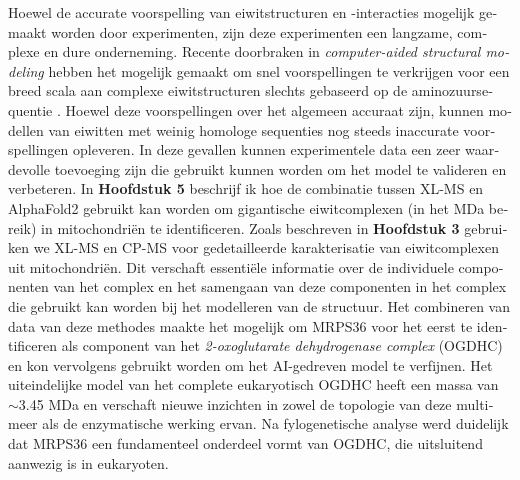 \begin{otherlanguage}{dutch}
    Hoewel de accurate voorspelling van eiwitstructuren en -interacties mogelijk gemaakt worden door experimenten, zijn deze experimenten een langzame, complexe en dure onderneming. Recente doorbraken in \emph{computer-aided structural modeling} hebben het mogelijk gemaakt om snel voorspellingen te verkrijgen voor een breed scala aan complexe eiwitstructuren slechts gebaseerd op de aminozuursequentie \cite{RN5, RN4}. Hoewel deze voorspellingen over het algemeen accuraat zijn, kunnen modellen van eiwitten met weinig homologe sequenties nog steeds inaccurate voorspellingen opleveren. In deze gevallen kunnen experimentele data een zeer waardevolle toevoeging zijn die gebruikt kunnen worden om het model te valideren en verbeteren. In \textbf{Hoofdstuk 5} beschrijf ik hoe de combinatie tussen XL-MS en AlphaFold2 \cite{RN4} gebruikt kan worden om gigantische eiwitcomplexen (in het MDa bereik) in mitochondriën te identificeren. Zoals beschreven in \textbf{Hoofdstuk 3} gebruiken we XL-MS en CP-MS voor gedetailleerde karakterisatie van eiwitcomplexen uit mitochondriën. Dit verschaft essentiële informatie over de individuele componenten van het complex en het samengaan van deze componenten in het complex die gebruikt kan worden bij het modelleren van de structuur. Het combineren van data van deze methodes maakte het mogelijk om MRPS36 voor het eerst te identificeren als component van het \emph{2-oxoglutarate dehydrogenase complex} (OGDHC) en kon vervolgens gebruikt worden om het AI-gedreven model te verfijnen. Het uiteindelijke model van het complete eukaryotisch OGDHC heeft een massa van $\sim$3.45 MDa en verschaft nieuwe inzichten in zowel de topologie van deze multimeer als de enzymatische werking ervan. Na fylogenetische analyse werd duidelijk dat MRPS36 een fundamenteel onderdeel vormt van OGDHC, die uitsluitend aanwezig is in eukaryoten.
\end{otherlanguage}
